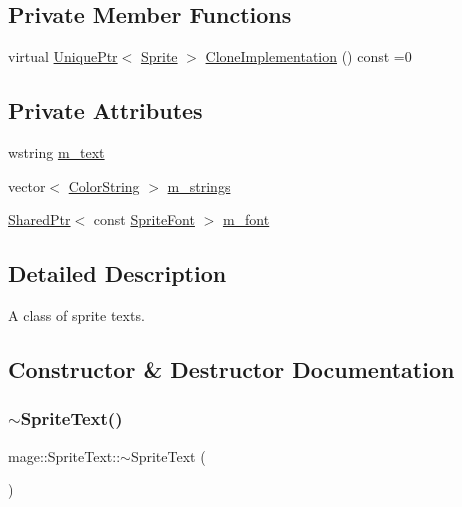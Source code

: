 \subsection*{Private Member Functions}
\begin{DoxyCompactItemize}
\item 
virtual \hyperlink{namespacemage_a3316d7143a973e37adf1110f2e80ca31}{Unique\+Ptr}$<$ \hyperlink{classmage_1_1_sprite}{Sprite} $>$ \hyperlink{classmage_1_1_sprite_text_aa2c63346f5ad7f63f7a6d474df3556ef}{Clone\+Implementation} () const =0
\end{DoxyCompactItemize}
\subsection*{Private Attributes}
\begin{DoxyCompactItemize}
\item 
wstring \hyperlink{classmage_1_1_sprite_text_a807d5dc467ef16f6c83762dfe6ad3391}{m\+\_\+text}
\item 
vector$<$ \hyperlink{classmage_1_1_color_string}{Color\+String} $>$ \hyperlink{classmage_1_1_sprite_text_ab528f96257fd7e690be765241b2d76f7}{m\+\_\+strings}
\item 
\hyperlink{namespacemage_a1e01ae66713838a7a67d30e44c67703e}{Shared\+Ptr}$<$ const \hyperlink{classmage_1_1_sprite_font}{Sprite\+Font} $>$ \hyperlink{classmage_1_1_sprite_text_a7d5f122cd5a87e47786796e41dbf6b71}{m\+\_\+font}
\end{DoxyCompactItemize}


\subsection{Detailed Description}
A class of sprite texts. 

\subsection{Constructor \& Destructor Documentation}
\hypertarget{classmage_1_1_sprite_text_aa30d68a79775dce902c190f2cd298bb4}{}\label{classmage_1_1_sprite_text_aa30d68a79775dce902c190f2cd298bb4} 
\subsubsection{\texorpdfstring{$\sim$\+Sprite\+Text()}{~SpriteText()}}
{\footnotesize\ttfamily mage\+::\+Sprite\+Text\+::$\sim$\+Sprite\+Text (\begin{DoxyParamCaption}{ }\end{DoxyParamCaption})\hspace{0.3cm}{\ttfamily [virtual]}}

